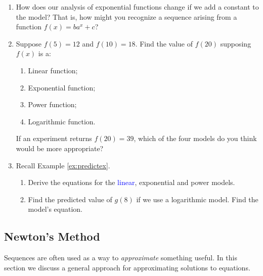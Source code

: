 \begin{exercises}{}{}
\begin{enumerate}
		
		\item How does our analysis of exponential functions change if we add a constant to the model? That is, how might you recognize a sequence arising from a function $f(x)=ba^x+c$?
	  
	  
	  \item Suppose $f(5)=12$ and $f(10)=18$. Find the value of $f(20)$ supposing $f(x)$ is a:
	  \begin{enumerate}
	    \item Linear function;
	    \item Exponential function;
	    \item Power function;
	    \item Logarithmic function.
	  \end{enumerate}
	  If an experiment returns $f(20)=39$, which of the four models do you think would be more appropriate?
	
		\item Recall Example \ref{ex:predictex}.
		\begin{enumerate}
		  \item Derive the equations for the \textcolor{Blue}{linear}, \textcolor{mMagenta}{exponential} and \textcolor{mGreen}{power} models.
		  \item Find the predicted value of $g(8)$ if we use a logarithmic model. Find the model's equation.
		\end{enumerate}
	
	\end{enumerate}
\end{exercises}


\clearpage



\subsection{Newton's Method}

Sequences are often used as a way to \emph{approximate} something useful. In this section we discuss a general approach for approximating solutions to equations.


